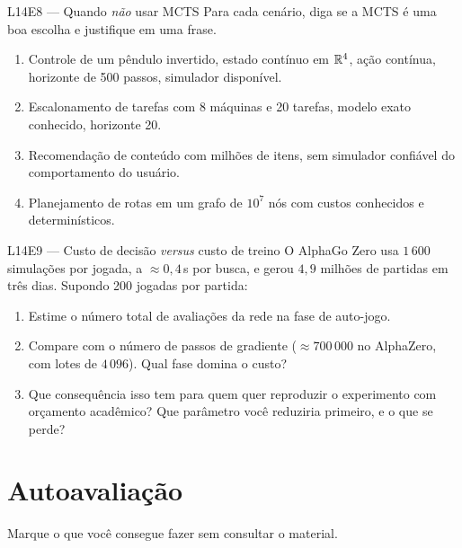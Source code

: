 \documentclass[11pt]{article}
\begin{document}
\begin{exbox}{L14E8 — Quando \emph{não} usar MCTS}
Para cada cenário, diga se a MCTS é uma boa escolha e justifique em uma frase.
\begin{enumerate}
  \item Controle de um pêndulo invertido, estado contínuo em $\mathbb{R}^4$, ação
        contínua, horizonte de 500 passos, simulador disponível.
  \item Escalonamento de tarefas com 8 máquinas e 20 tarefas, modelo exato
        conhecido, horizonte 20.
  \item Recomendação de conteúdo com milhões de itens, sem simulador confiável do
        comportamento do usuário.
  \item Planejamento de rotas em um grafo de $10^{7}$ nós com custos conhecidos e
        determinísticos.
\end{enumerate}
\end{exbox}

\begin{exbox}{L14E9 — Custo de decisão \emph{versus} custo de treino}
O AlphaGo Zero usa $1\,600$ simulações por jogada, a $\approx 0{,}4$\,s por busca,
e gerou $4{,}9$ milhões de partidas em três dias. Supondo 200 jogadas por partida:
\begin{enumerate}
  \item Estime o número total de avaliações da rede na fase de auto-jogo.
  \item Compare com o número de passos de gradiente ($\approx 700\,000$ no
        AlphaZero, com lotes de $4\,096$). Qual fase domina o custo?
  \item Que consequência isso tem para quem quer reproduzir o experimento com
        orçamento acadêmico? Que parâmetro você reduziria primeiro, e o que se
        perde?
\end{enumerate}
\end{exbox}

\section{Autoavaliação}

Marque o que você consegue fazer sem consultar o material.
\end{document}
